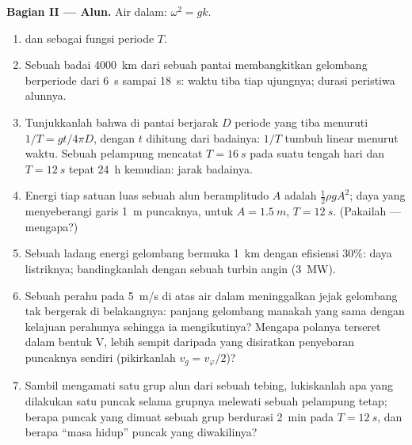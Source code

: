 \begin{problem}
\medskip
\noindent\textbf{Bagian II --- Alun.}
Air dalam: $\omega^2 = gk$.
\begin{enumerate}[resume]
  \item {} dan  sebagai fungsi periode $T$.
  \item Sebuah badai \qty{4000}{km} dari sebuah pantai membangkitkan gelombang berperiode
        dari \qty{6}{s} sampai \qty{18}{s}: waktu tiba tiap ujungnya;
        durasi peristiwa alunnya.
  \item Tunjukkanlah bahwa di pantai berjarak $D$ periode yang tiba menuruti
        $1/T = gt/4\pi D$, dengan $t$ dihitung dari badainya: $1/T$ tumbuh
        linear menurut waktu. Sebuah pelampung mencatat $T = \qty{16}{s}$ pada suatu tengah hari
        dan $T = \qty{12}{s}$ tepat \qty{24}{h} kemudian: jarak
        badainya.
  \item Energi tiap satuan luas sebuah alun beramplitudo $A$ adalah $\tfrac12\rho
        gA^2$; daya yang menyeberangi garis \qty{1}{m} puncaknya, untuk $A =
        \qty{1.5}{m}$, $T = \qty{12}{s}$. (Pakailah  --- mengapa?)
  \item Sebuah ladang energi gelombang bermuka \qty{1}{km} dengan efisiensi $30\%$:
        daya listriknya; bandingkanlah dengan sebuah turbin angin (\qty{3}{MW}).
  \item Sebuah perahu pada \qty{5}{m/s} di atas air dalam meninggalkan jejak gelombang tak bergerak
        di belakangnya: panjang gelombang manakah yang  sama dengan
        kelajuan perahunya sehingga ia mengikutinya? Mengapa polanya terseret dalam
        bentuk V, lebih sempit daripada yang disiratkan penyebaran puncaknya sendiri
        (pikirkanlah $v_g = v_\varphi/2$)?
  \item Sambil mengamati satu grup alun dari sebuah tebing, lukiskanlah apa yang dilakukan
        satu puncak selama grupnya melewati sebuah
        pelampung tetap; berapa puncak yang dimuat sebuah grup berdurasi
        \qty{2}{min} pada $T = \qty{12}{s}$, dan berapa ``masa hidup'' puncak
        yang diwakilinya?
\end{enumerate}


\end{problem}
